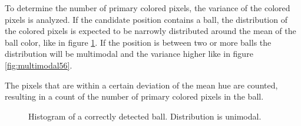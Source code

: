 To determine the number of primary colored pixels, the variance of the colored pixels is analyzed. If the candidate position contains a ball, the distribution of the colored pixels is expected to be narrowly distributed around the mean of the ball color, like in figure \ref{fig:unimodal6}. If the position is between two or more balls the distribution will be multimodal and the variance higher like in figure \ref{fig:multimodal56}.

The pixels that are within a certain deviation of the mean hue are counted, resulting in a count of the number of primary colored pixels in the ball.

\begin{figure}[htpb]
  \centering
  \quad           
   \caption{Histogram of a correctly detected ball. Distribution is unimodal.}
  \label{fig:unimodal6}
\end{figure}
